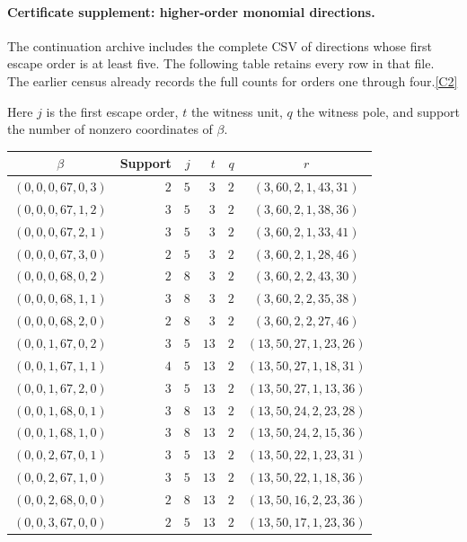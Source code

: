 \documentclass[11pt]{article}
\newcommand{\src}[1]{\hyperlink{src:#1}{[#1]}}
\begin{document}
\paragraph{Certificate supplement: higher-order monomial directions.}
The continuation archive includes the complete CSV of directions whose first
escape order is at least five. The following table retains every row in that
file. The earlier census already records the full counts for orders one
through four.\src{C2}

Here $j$ is the first escape order, $t$ the witness unit, $q$ the witness pole, and support the number of nonzero coordinates of $\beta$.

\begingroup\small\setlength{\tabcolsep}{4pt}

\begin{longtable}{crrrrc}
\toprule
$\beta$ & Support & $j$ & $t$ & $q$ & $r$\\
\midrule
\endhead
$(0,0,0,67,0,3)$ & $2$ & $5$ & $3$ & $2$ & $(3,60,2,1,43,31)$\\
$(0,0,0,67,1,2)$ & $3$ & $5$ & $3$ & $2$ & $(3,60,2,1,38,36)$\\
$(0,0,0,67,2,1)$ & $3$ & $5$ & $3$ & $2$ & $(3,60,2,1,33,41)$\\
$(0,0,0,67,3,0)$ & $2$ & $5$ & $3$ & $2$ & $(3,60,2,1,28,46)$\\
$(0,0,0,68,0,2)$ & $2$ & $8$ & $3$ & $2$ & $(3,60,2,2,43,30)$\\
$(0,0,0,68,1,1)$ & $3$ & $8$ & $3$ & $2$ & $(3,60,2,2,35,38)$\\
$(0,0,0,68,2,0)$ & $2$ & $8$ & $3$ & $2$ & $(3,60,2,2,27,46)$\\
$(0,0,1,67,0,2)$ & $3$ & $5$ & $13$ & $2$ & $(13,50,27,1,23,26)$\\
$(0,0,1,67,1,1)$ & $4$ & $5$ & $13$ & $2$ & $(13,50,27,1,18,31)$\\
$(0,0,1,67,2,0)$ & $3$ & $5$ & $13$ & $2$ & $(13,50,27,1,13,36)$\\
$(0,0,1,68,0,1)$ & $3$ & $8$ & $13$ & $2$ & $(13,50,24,2,23,28)$\\
$(0,0,1,68,1,0)$ & $3$ & $8$ & $13$ & $2$ & $(13,50,24,2,15,36)$\\
$(0,0,2,67,0,1)$ & $3$ & $5$ & $13$ & $2$ & $(13,50,22,1,23,31)$\\
$(0,0,2,67,1,0)$ & $3$ & $5$ & $13$ & $2$ & $(13,50,22,1,18,36)$\\
$(0,0,2,68,0,0)$ & $2$ & $8$ & $13$ & $2$ & $(13,50,16,2,23,36)$\\
$(0,0,3,67,0,0)$ & $2$ & $5$ & $13$ & $2$ & $(13,50,17,1,23,36)$\\

\end{longtable}
\end{document}
